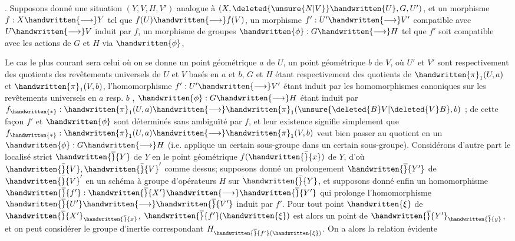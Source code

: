 
. Supposons donné une situation $(Y,V,H,V')$ analogue à $(X,\deleted{\unsure{N|V}}\handwritten{U},G,U')$, et un morphisme $f:X\handwritten{\longrightarrow}Y$ tel que $f(U)\handwritten{\longrightarrow}f(V)$, un morphisme $f':U'\handwritten{\longrightarrow}V'$ compatible avec $U\handwritten{\longrightarrow}V$ induit par $f$, un morphisme de groupes $\handwritten{\phi}:G\handwritten{\longrightarrow}H$ tel que  $f'$ soit compatible avec les actions de $G$ et $H$ via $\handwritten{\phi}$, 

Le cas le plus courant sera celui où on se donne un point géométrique $a$ de $U$,  un point géométrique $b$  de $V$, où $U'$ et $V'$ sont respectivement des quotients des revêtements universels de $U$ et $V$ basés en $a$ et $b$, $G$ et $H$ étant respectivement des quotients de $\handwritten{\pi}_{1}(U,a)$ et $\handwritten{\pi}_{1}(V,b)$, l'homomorphisme $f':U'\handwritten{\longrightarrow}V'$ étant induit par les homomorphismes canoniques sur les revêtements universels en $a$ resp. $b$  ,  $\handwritten{\phi}:G\handwritten{\longrightarrow}H$ étant induit par $f_{\handwritten{*}}:\handwritten{\pi}_{1}(U,a)\handwritten{\longrightarrow}\handwritten{\pi}_{1}(\unsure{\deleted{B}V|\deleted{V}B},b)$ ; de cette façon $f'$ et $\handwritten{\phi}$ sont déterminés sans ambiguïté par $f$, et leur existence signifie simplement que $f_{\handwritten{*}}:\handwritten{\pi}_{1}(U,a)\handwritten{\longrightarrow}\handwritten{\pi}_{1}(V,b)$ veut bien passer au quotient en un $\handwritten{\phi}:G\handwritten{\longrightarrow}H$ (i.e. applique un certain sous-groupe dans un certain sous-groupe). Considérons d'autre part le localisé strict $\handwritten{\overline}{Y}$ de $Y$ en le point géométrique $f(\handwritten{\bar}{x})$ de $Y$, d'où  $\handwritten{\bar}{V},\handwritten{\bar}{V}'$ comme dessus; supposons donné un prolongement $\handwritten{\overline}{Y'}$ de $\handwritten{\bar}{V}'$ en un schéma à groupe d'opérateurs $H$ sur $\handwritten{\bar}{Y}$, et supposons donné enfin un homomorphisme $\handwritten{\overline}{f'}:\handwritten{\overline}{X'}\handwritten{\longrightarrow}\handwritten{\overline}{Y'}$ qui prolonge l'homomorphisme  $\handwritten{\overline}{U'}\handwritten{\longrightarrow}\handwritten{\overline}{V'}$ induit par $f'$. Pour tout point $\handwritten{\xi}$ de $\handwritten{\overline}{X'}_{\handwritten{\bar}{x}}$, $\handwritten{\overline}{f'}(\handwritten{\xi})$ est alors un point de $\handwritten{\overline}{Y'}_{\handwritten{\bar}{y}}$, et on peut considérer le groupe d'inertie correspondant $H_{\handwritten{\overline}{f'}(\handwritten{\xi})}$. On a alors la relation évidente
